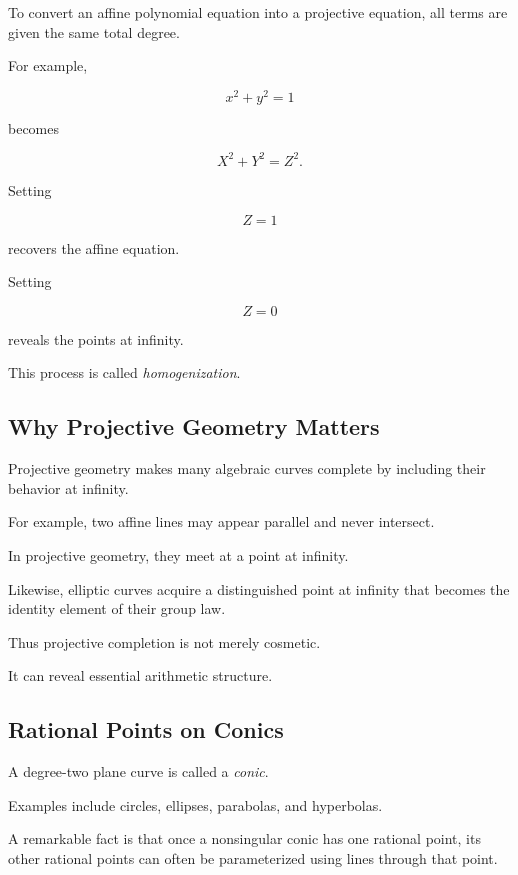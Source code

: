 To convert an affine polynomial equation into a projective equation, all
terms are given the same total degree.

For example,

\[ x^2+y^2=1 \]

becomes

\[ \boxed{X^2+Y^2=Z^2.} \]

Setting

\[ Z=1 \]

recovers the affine equation.

Setting

\[ Z=0 \]

reveals the points at infinity.

This process is called \emph{homogenization}.

\subsection{Why Projective Geometry Matters}
\label{subsec:why-projective-diophantine}

Projective geometry makes many algebraic curves complete by including their
behavior at infinity.

For example, two affine lines may appear parallel and never intersect.

In projective geometry, they meet at a point at infinity.

Likewise, elliptic curves acquire a distinguished point at infinity that
becomes the identity element of their group law.

Thus projective completion is not merely cosmetic.

It can reveal essential arithmetic structure.

\subsection{Rational Points on Conics}
\label{subsec:rational-points-conics}

A degree-two plane curve is called a \emph{conic}.

Examples include circles, ellipses, parabolas, and hyperbolas.

A remarkable fact is that once a nonsingular conic has one rational point,
its other rational points can often be parameterized using lines through
that point.

